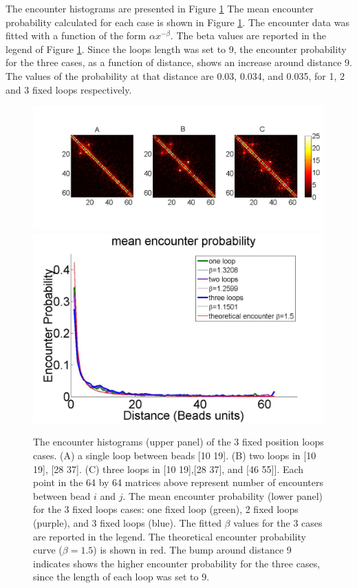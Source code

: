 \documentclass[12pt]{paper}
\begin{document}
The encounter histograms are presented in Figure \ref{encounterHistogram123Loops} The mean encounter probability calculated for each case is shown in Figure \ref{encounterHistogram123Loops}. The encounter data was fitted with a function of the form $\alpha x^{-\beta}$. The beta values are reported in the legend of Figure \ref{encounterHistogram123Loops}. Since the loops length was set to 9, the encounter probability for the three cases, as a function of distance, shows an increase around distance 9. The values of the probability at that distance are 0.03, 0.034, and 0.035, for 1, 2 and 3 fixed loops respectively. 
\begin{figure}[H]
\centering
\hspace{-72pt}
\vspace{-40pt}
\includegraphics[scale=0.4]{encounterHistogram123Loops}
\includegraphics[scale=0.2]{meanEncounterProbability123Loops}
\caption{\scriptsize{The encounter histograms (upper panel) of the 3 fixed position loops cases. (A) a single loop between beads [10 19]. (B) two loops in [10 19], [28 37]. (C) three loops in [10 19],[28 37], and [46 55]]. Each point in the 64 by 64 matrices above represent number of encounters between bead $i$ and $j$. The mean encounter probability (lower panel) for the 3 fixed loops cases: one fixed loop (green), 2 fixed loops (purple), and 3 fixed loops (blue). The fitted $\beta$ values  for the 3 cases are reported in the legend. The theoretical encounter probability curve ($\beta=1.5$) is shown in red. The bump around distance 9 indicates shows the higher encounter probability for the three cases, since the length of each loop was set to 9.}}
\label{encounterHistogram123Loops}
\end{figure}
\end{document}
